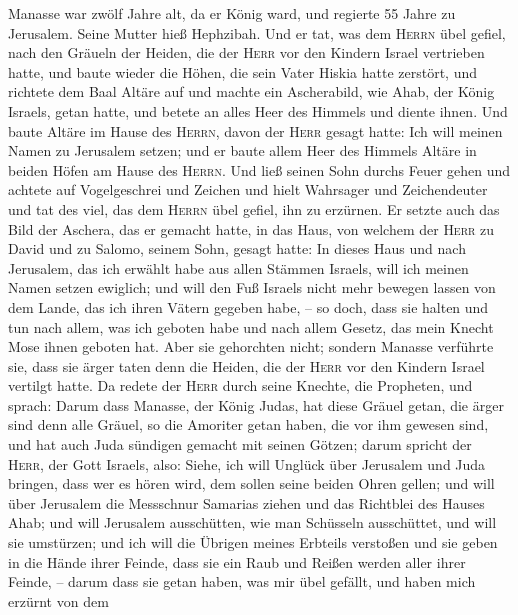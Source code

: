  Manasse war zwölf Jahre alt, da er König ward, und
regierte 55 Jahre zu Jerusalem. Seine Mutter hieß Hephzibah.
 Und er tat, was dem \textsc{Herrn} übel gefiel, nach den
Gräueln der Heiden, die der \textsc{Herr} vor den Kindern Israel
vertrieben hatte,  und baute wieder die Höhen, die sein
Vater Hiskia hatte zerstört, und richtete dem Baal Altäre auf und machte
ein Ascherabild, wie Ahab, der König Israels, getan hatte, und betete an
alles Heer des Himmels und diente ihnen.  Und baute Altäre
im Hause des \textsc{Herrn}, davon der \textsc{Herr} gesagt hatte: Ich
will meinen Namen zu Jerusalem setzen;  und er baute allem
Heer des Himmels Altäre in beiden Höfen am Hause des \textsc{Herrn}.
 Und ließ seinen Sohn durchs Feuer gehen und achtete auf
Vogelgeschrei und Zeichen und hielt Wahrsager und Zeichendeuter und tat
des viel, das dem \textsc{Herrn} übel gefiel, ihn zu erzürnen.
 Er setzte auch das Bild der Aschera, das er gemacht
hatte, in das Haus, von welchem der \textsc{Herr} zu David und zu
Salomo, seinem Sohn, gesagt hatte: In dieses Haus und nach Jerusalem,
das ich erwählt habe aus allen Stämmen Israels, will ich meinen Namen
setzen ewiglich;  und will den Fuß Israels nicht mehr
bewegen lassen von dem Lande, das ich ihren Vätern gegeben habe, -- so
doch, dass sie halten und tun nach allem, was ich geboten habe und nach
allem Gesetz, das mein Knecht Mose ihnen geboten hat. 
Aber sie gehorchten nicht; sondern Manasse verführte sie, dass sie ärger
taten denn die Heiden, die der \textsc{Herr} vor den Kindern Israel
vertilgt hatte.  Da redete der \textsc{Herr} durch seine
Knechte, die Propheten, und sprach:  Darum dass Manasse,
der König Judas, hat diese Gräuel getan, die ärger sind denn alle
Gräuel, so die Amoriter getan haben, die vor ihm gewesen sind, und hat
auch Juda sündigen gemacht mit seinen Götzen;  darum
spricht der \textsc{Herr}, der Gott Israels, also: Siehe, ich will
Unglück über Jerusalem und Juda bringen, dass wer es hören wird, dem
sollen seine beiden Ohren gellen;  und will über
Jerusalem die Messschnur Samarias ziehen und das Richtblei des Hauses
Ahab; und will Jerusalem ausschütten, wie man Schüsseln ausschüttet, und
will sie umstürzen;  und ich will die Übrigen meines
Erbteils verstoßen und sie geben in die Hände ihrer Feinde, dass sie ein
Raub und Reißen werden aller ihrer Feinde, --  darum dass
sie getan haben, was mir übel gefällt, und haben mich erzürnt von dem
